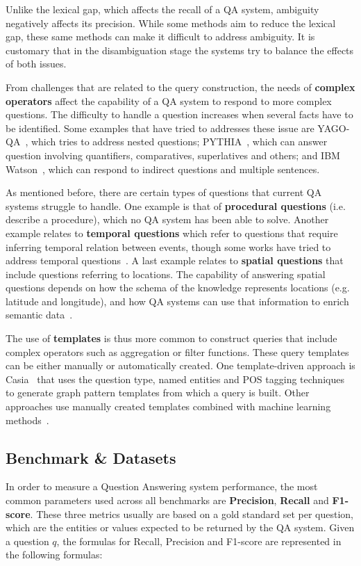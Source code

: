 Unlike the lexical gap, which affects the recall of a QA system, ambiguity negatively affects 
its precision. While some methods aim to reduce the lexical gap, these same methods can make it 
difficult to address ambiguity. It is customary that in the disambiguation stage the systems 
try to balance the effects of both issues.

From challenges that are related to the query construction, the needs of \textbf{complex operators} 
affect the capability of a QA system to respond to more complex questions. The difficulty to 
handle a question increases when several facts have to be identified. Some examples that have 
tried to addresses these issue are YAGO-QA~\cite{qa:AdolphsTSUW11}, which tries to address 
nested questions; PYTHIA~\cite{qa:UngerC11}, which can answer question involving quantifiers, 
comparatives, superlatives and others; and IBM Watson~\cite{qa:GliozzoK12}, which can respond 
to indirect questions and multiple sentences.

As mentioned before, there are certain types of questions that current QA systems struggle to 
handle. One example is that of \textbf{procedural questions} (i.e. describe a procedure), which 
no QA system has been able to solve. Another example relates to \textbf{temporal questions} 
which refer to questions that require inferring temporal relation between events, though some 
works have tried to address temporal questions~\cite{qa:Allen83,qa:FerrandezSKDFNITONMG11,
qa:MeloRN11}. A last example relates to \textbf{spatial questions} that include questions 
referring to locations. The capability of answering spatial questions depends on how the schema 
of the knowledge represents locations (e.g. latitude and longitude), and how QA systems can use 
that information to enrich semantic data~\cite{qa:YounisJTA12,qa:graph-2-ZouHWYHZ14}.

The use of \textbf{templates} is thus more common to construct \SPARQL{} queries that include 
complex operators such as aggregation or filter functions. These \SPARQL{} query templates can be 
either manually or automatically created. One template-driven approach is Casia~\cite{qa:shizhu2014casia} 
that uses the question type, named entities and POS tagging techniques to generate graph 
pattern templates from which a \SPARQL{} query is built. Other approaches use manually created 
templates combined with machine learning methods~\cite{qa:AbachaZ12}. 

\subsection{Benchmark \& Datasets}
\label{cap2:qakg/benchmarkDatasets}
In order to measure a Question Answering system performance, the most common parameters used 
across all benchmarks are \textbf{Precision}, \textbf{Recall} and \textbf{F1-score}. These 
three metrics usually are based on a gold standard set per question, which are the entities or 
values expected to be returned by the QA system. Given a question $q$, the formulas for Recall, 
Precision and F1-score are represented in the following formulas:

